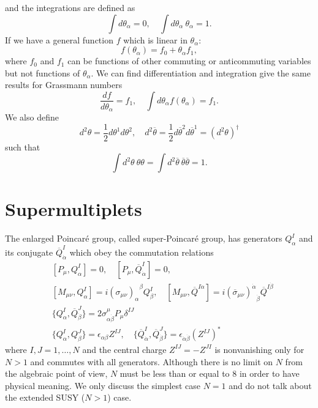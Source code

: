 \documentclass[12pt]{report}
\begin{document}
and the integrations are defined as
\begin{equation}
\int d\theta_{\alpha} = 0, \quad 
\int d\theta_{\alpha} \ \theta_{\alpha}  = 1 .
\end{equation}
If we have a general function $f$ which is linear in $\theta_{\alpha}$:
\begin{equation}
f(\theta_{\alpha}) = f_{0} + \theta_{\alpha} f_{1} ,
\end{equation}
where $f_{0}$ and $f_{1}$ can be functions of other commuting or anticommuting variables but not functions of $\theta_{\alpha}$.
We can find differentiation and integration give the same results for Grassmann numbers
\begin{equation}
\frac{df}{d\theta_{\alpha}} = f_{1}, \quad \int d\theta_{\alpha} f(\theta_{\alpha}) = f_{1} .
\end{equation}
We also define
\begin{equation}
d^{2} \theta = \frac{1}{2} d\theta^{1} d\theta^{2}, \quad  
d^{2}\overline{\theta} = \frac{1}{2} d\overline{\theta}^{2} d\overline{\theta}^{1} = (d^{2} \theta)^{\dag}
\end{equation}
such that
\begin{equation}
\int d^{2} \theta \ \theta \theta = \int d^{2} \overline{\theta} \ \overline{\theta} \overline{\theta} = 1 .
\end{equation}



\section{Supermultiplets} \label{sec: supermultiplets}
The enlarged Poincar\'{e} group, called super-Poincar\'{e} group, has generators $Q^{I}_{\alpha}$ and its conjugate $\overline{Q}^{I}_{\dot{\alpha}}$ which obey the commutation relations
\begin{align}
& [P_{\mu}, Q^{I}_{\alpha}] = 0, \quad 
[P_{\mu}, \overline{Q}^{I}_{\dot{\alpha}}] = 0,\\
& [M_{\mu \nu}, Q^{I}_{\alpha}] = i {(\sigma_{\mu \nu})_{\alpha}}^{\beta} Q^{I}_{\beta}, \quad 
[M_{\mu \nu}, \overline{Q}^{I\dot{\alpha}}] = i {(\overline{\sigma}_{\mu \nu})^{\dot{\alpha}}}_{\dot{\beta}} \overline{Q}^{I \dot{\beta}}\\
& \{Q^{I}_{\alpha}, \overline{Q}^{J}_{\dot{\beta}}\} = 2 \sigma^{\mu}_{\alpha \dot{\beta}} P_{\mu} \delta^{IJ}\\
& \{Q^{I}_{\alpha}, Q^{J}_{\beta}\} = \epsilon_{\alpha \beta} Z^{IJ}, \quad 
\{\overline{Q}^{I}_{\dot{\alpha}}, \overline{Q}^{J}_{\dot{\beta}}\} = \epsilon_{\dot{\alpha} \dot{\beta}} (Z^{IJ})^{*}
\end{align}
where $I, J = 1, \dots, N$ and the central charge $Z^{IJ} = -Z^{JI}$ is nonvanishing only for $N > 1$ and commutes with all generators.
Although there is no limit on $N$ from the algebraic point of view, $N$ must be less than or equal to $8$ in order to have physical meaning.
We only discuss the simplest case $N = 1$ and do not talk about the extended SUSY ($N > 1$) case.
\end{document}
